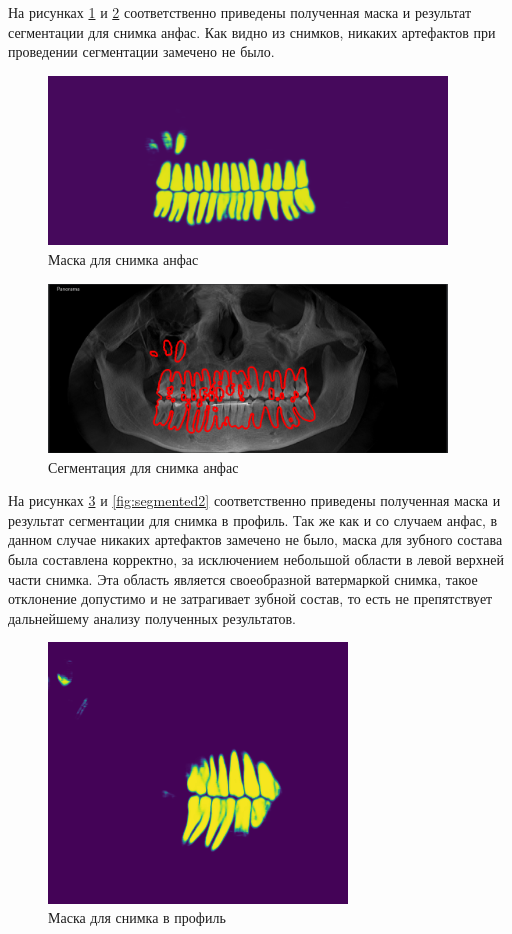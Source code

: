 На рисунках \ref{fig:predicted1} и \ref{fig:segmented1} соответственно приведены полученная маска и результат сегментации для снимка анфас. Как видно из снимков, никаких артефактов при проведении сегментации замечено не было.

\begin{figure}[H]
	\centering
	\includegraphics[width=400px]{img/predicted1.png}
	\caption{Маска для снимка анфас}
	\label{fig:predicted1}
\end{figure}

\begin{figure}[H]
	\centering
	\includegraphics[width=400px]{img/segmented1.png}
	\caption{Сегментация для снимка анфас}
	\label{fig:segmented1}
\end{figure}

На рисунках \ref{fig:predicted2} и \ref{fig:segmented2} соответственно приведены полученная маска и результат сегментации для снимка в профиль. Так же как и со случаем анфас, в данном случае никаких артефактов замечено не было, маска для зубного состава была составлена корректно, за исключением небольшой области в левой верхней части снимка. Эта область является своеобразной ватермаркой снимка, такое отклонение допустимо и не затрагивает зубной состав, то есть не препятствует дальнейшему анализу полученных результатов.

\begin{figure}[H]
	\centering
	\includegraphics[width=300px]{img/predicted2.png}
	\caption{Маска для снимка в профиль}
	\label{fig:predicted2}
\end{figure}

